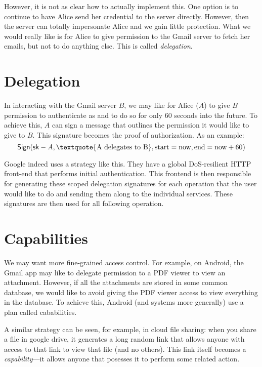 However, it is not as clear how to actually implement this. One option is to continue to have Alice send her credential to the server directly. However, then the server can totally impersonate Alice and we gain little protection. What we would really like is for Alice to give permission to the Gmail server to fetch her emails, but not to do anything else. This is called \emph{delegation}.

\section{Delegation}
In interacting with the Gmail server $B$, we may like for Alice ($A$) to give $B$ permission to authenticate as  and to do so for only 60 seconds into the future. To achieve this, $A$ can sign a message that outlines the permission it would like to give to $B$. This signature becomes the proof of authorization. As an example:
\[ \Sign(\sk-A, \text{\textquote{A delegates to B}}, \text{start}=\text{now}, \text{end}=\text{now}+60) \]

Google indeed uses a strategy like this. They have a global DoS-resilient HTTP front-end that performs initial authentication. This frontend is then responsible for generating these scoped delegation signatures for each operation that the user would like to do and sending them along to the individual services. These signatures are then used for all following operation.

\section{Capabilities}
We may want more fine-grained access control. For example, on Android, the Gmail app may like to delegate permission to a PDF viewer to view an attachment. However, if all the attachments are stored in some common database, we would like to avoid giving the PDF viewer access to view everything in the database. To achieve this, Android (and systems more generally) use a plan called cababilities.

A similar strategy can be seen, for example, in cloud file sharing: when you share a file in google drive, it generates a long random link that allows anyone with access to that link to view that file (and no others). This link itself becomes a \emph{capability}---it allows anyone that posesses it to perform some related action.
